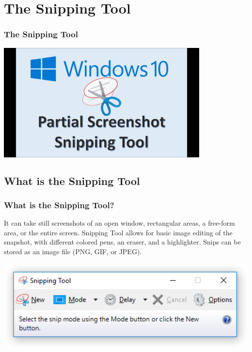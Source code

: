 \documentclass{beamer}
\begin{document}
	\section{The Snipping Tool}	
		\begin{frame}
		\frametitle{The Snipping Tool}
		\begin{center}
			\includegraphics[width = 0.8\textwidth]{images/maxresdefault (2).jpg}
		\end{center}
	\end{frame}
	
	\subsection{What is the Snipping Tool}
	\begin{frame}
		\frametitle{What is the Snipping Tool?}
		\begin{outline}
			\1 It can take still screenshots of an open window, rectangular areas, a free-form area, or the entire screen. 
			\1 Snipping Tool allows for basic image editing of the snapshot, with different colored pens, an eraser, and a highlighter.
			\1 Snips can be stored as an image file (PNG, GIF, or JPEG).
		\end{outline}
		\begin{center}
			\includegraphics[width = 1.0\textwidth]{images/snipping-tool.png}
		\end{center}
	\end{frame}
\end{document}
